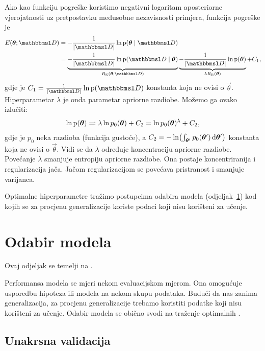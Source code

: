 \documentclass[utf8, diplomski, lmodern]{fer}
\begin{document}
Ako kao funkciju pogreške koristimo negativni logaritam aposteriorne vjerojatnosti uz pretpostavku međusobne nezavisnosti primjera, funkcija pogreške je
\begin{align}
E(\vec\theta;\set{D}) 
&= -\frac{1}{\envert{\set D}}\ln\p(\vec\theta\mid\set{D}) \\
&= 
\underbrace{-\frac{1}{\envert{\set D}}\ln\p(\set{D}\mid\vec\theta)}_{R_\text{E}(\vec\theta;\set{D})}
\underbrace{-\frac{1}{\envert{\set D}}\ln\p(\vec\theta)}_{\lambda R_\text{R}(\vec\theta)} + C_1
\text{,}
\end{align}
gdje je $C_1=\frac{1}{\envert{\set D}}\ln\p(\set D)$ konstanta koja ne ovisi o $\vec\theta$. Hiperparametar $\lambda$ je onda parametar apriorne razdiobe. Možemo ga ovako izlučiti:
\begin{align}
\ln\p(\vec\theta) \eqqcolon \lambda \ln p_0(\vec\theta) +C_2 = \ln p_0(\vec\theta)^\lambda +C_2 \text{,}
\end{align}
gdje je $p_0$ neka razdioba (funkcija gustoće), a $C_2=-\ln\del{\int_{\vec{\theta'}}p_0(\vec\theta')\dif\vec{\theta'}}$ konstanta koja ne ovisi o $\vec\theta$. Vidi se da $\lambda$ određuje koncentraciju apriorne razdiobe. Povećanje $\lambda$ smanjuje entropiju apriorne razdiobe. Ona postaje koncentriranija i regularizacija jača. Jačom regularizacijom se povećava pristranost i smanjuje varijanca.

Optimalne hiperparametre tražimo postupcima odabira modela (odjeljak~\ref{sec:su-odabir-modela}) kod kojih se za procjenu generalizacije koriste podaci koji nisu korišteni za učenje.


\section{Odabir modela} \label{sec:su-odabir-modela}

Ovaj odjeljak se temelji na \citet[odjeljak 2.6]{Snajder:2014:SU}. 

Performansa modela se mjeri nekom evaluacijskom mjerom. Ona omogućuje usporedbu hipoteza ili modela na nekom skupu podataka. Budući da nas zanima generalizacija, za procjenu generalizacije trebamo koristiti podatke koji nisu korišteni za učenje. Odabir modela se obično svodi na traženje optimalnih .

\subsection{Unakrsna validacija}
\end{document}
